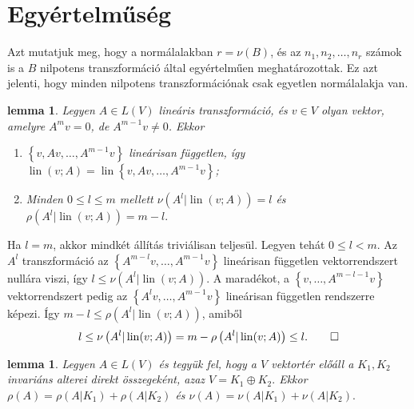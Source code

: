 \documentclass[a4paper, showtrims]{memoir}
\makeatletter
\renewenvironment{proof}[1][\proofname]
    {\par\pushQED{\qed}%
    \normalfont \topsep6\p@\@plus6\p@\relax
    \trivlist
    \item[\hskip\labelsep
        \itshape
    #1\@addpunct{:}]\ignorespaces}
    {\popQED\endtrivlist\@endpefalse}
\theoremstyle{plain}
\newtheorem{lemma}[proposition]{lemma}
\theoremstyle{remark}
\theoremstyle{definition}
\DeclareMathOperator{\lin}{lin}
\makeatother
\begin{document}
\section{Egyértelműség}
Azt mutatjuk meg, hogy a normálalakban $r=\nu\left( B \right)$,
és az $n_1,n_2,\ldots,n_r$ számok is a $B$ nilpotens transzformáció által egyértelműen meghatározottak.
Ez azt jelenti, hogy minden nilpotens transzformációnak csak egyetlen normálalakja van.
\begin{lemma}
	Legyen $A\in L\left( V \right)$ lineáris transzformáció, és $v\in V$ olyan vektor, amelyre
	$A^mv=0$, de $A^{m-1}v\neq 0$.
	Ekkor
	\begin{enumerate}
		\item
		      $\left\{ v,Av,\ldots,A^{m-1}v \right\}$ lineárisan független,
		      így $\lin(v;A )=\lin\left\{ v,Av,\ldots,A^{m-1}v \right\}$;
		\item
		      Minden $0\leq l\leq m$ mellett
		      \begin{math}
			      \nu\left( A^l|\lin(v;A) \right)=l
		      \end{math}
		      és
		      \begin{math}
			      \rho\left( A^l|\lin(v;A) \right)=m-l.
		      \end{math}\qedhere
	\end{enumerate}
\end{lemma}
\begin{proof}
	Ha $l=m$, akkor mindkét állítás triviálisan teljesül. Legyen tehát $0\leq l<m$.
	Az $A^l$ transzformáció az $\left\{ A^{m-l}v,\ldots,A^{m-1}v \right\}$
	lineárisan független vektorrendszert nullára viszi,
	így $l\leq\nu\left( A^l|\lin(v;A)\right)$.
	A maradékot, a
	$\left\{ v,\ldots,A^{m-l-1}v \right\}$ vektorrendszert pedig az
	$\left\{ A^lv,\ldots,A^{m-1}v \right\}$ lineárisan független rendszerre képezi.
	Így
	$m-l\leq \rho\left( A^l |\lin(v;A)\right)$,
	amiből
	\[
		l\leq\nu\left( A^l|\lin(v;A) \right)=m-\rho\left( A^l|\lin(v;A) \right)\leq l.\qedhere
	\]
\end{proof}
\begin{lemma}
	Legyen $A\in L\left( V \right)$ és tegyük fel, hogy a $V$ vektortér előáll a $K_1,K_2$ invariáns alterei
	direkt összegeként, azaz
	\(
	V=K_1\oplus K_2.
	\)
	Ekkor
	\begin{math}
		\rho\left( A \right)=\rho\left( A|K_1 \right)+\rho\left( A|K_2 \right)
	\end{math}
	és
	\begin{math}
		\nu\left( A \right)=\nu\left( A|K_1 \right)+\nu\left( A|K_2 \right).
	\end{math}
	\qedhere
\end{lemma}
\end{document}
